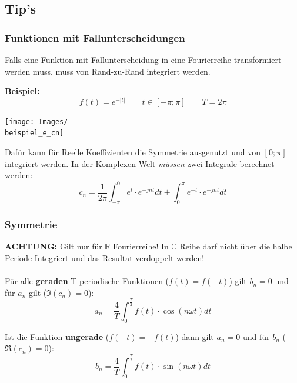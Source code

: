 \subsection{Tip's}\label{tip}
\subsubsection{Funktionen mit Fallunterscheidungen}
Falls eine Funktion mit Fallunterscheidung in eine Fourierreihe transformiert werden muss, muss von Rand-zu-Rand integriert werden.

\noindent\textbf{Beispiel:}
\[
f(t)= e^{-\left|t\right|} \qquad t \in [-\pi;\pi] \qquad T = 2\pi
\]
\begin{center}
	\texttt{[image: Images/\\beispiel\_e\_cn]}
\end{center}

\noindent Dafür kann für Reelle Koeffizienten die Symmetrie ausgenutzt und von $[0;\pi]$ integriert werden. In der Komplexen Welt \textit{müssen} zwei Integrale berechnet werden:
\[
c_n = \frac{1}{2\pi}\int_{-\pi}^{0}e^t\cdot e^{-jnt}dt + \int_{0}^{\pi}e^{-t}\cdot e^{-jnt}dt
\]

\subsubsection{Symmetrie}
\textbf{ACHTUNG:} Gilt nur für $\mathbb{R}$ Fourierreihe! In $\mathbb{C}$ Reihe darf nicht über die halbe Periode Integriert und das Resultat verdoppelt werden! 
~\\
~\\
\noindent Für alle \textbf{geraden} T-periodische Funktionen ($f(t) = f(-t)$)  gilt $b_n = 0$ und für $a_n$ gilt ($\Im(c_n) = 0$): 
\[
a_n = \frac{4}{T}\int_{0}^{\frac{T}{2}}f(t) \cdot \cos(n\omega t)dt
\]

\noindent Ist die Funktion \textbf{ungerade} ($f(-t) = -f(t)$) dann gilt $a_n = 0$ und für $b_n$ ($\Re(c_n) = 0$):
\[
	b_n = \frac{4}{T}\int_{0}^{\frac{T}{2}}f(t) \cdot \sin(n\omega t)dt 
\]


